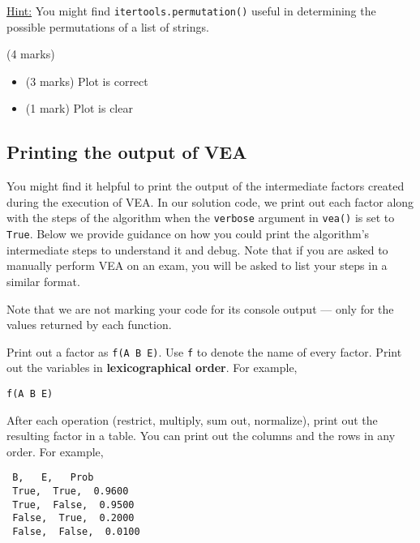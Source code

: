 \documentclass[12pt]{article}
\begin{document}
\begin{enumerate}[font=\Large,label=(\alph*)]
\underline{Hint:} You might find \verb+itertools.permutation()+ useful in determining the possible permutations of a list of strings.

\newpage
\begin{markscheme}
(4 marks)

\begin{itemize}
\item (3 marks) Plot is correct
\item (1 mark) Plot is clear
\end{itemize}
\end{markscheme}


\end{enumerate}

\begin{appendices}

\section{Printing the output of VEA}
\label{apx:vea_output_format}

You might find it helpful to print the output of the intermediate factors created during the execution of VEA. In our solution code, we print out each factor along with the steps of the algorithm when the \verb+verbose+ argument in \verb+vea()+ is set to \verb+True+. Below we provide guidance on how you could print the algorithm's intermediate steps to understand it and debug. Note that if you are asked to manually perform VEA on an exam, you will be asked to list your steps in a similar format.

Note that we are not marking your code for its console output --- only for the values returned by each function.

Print out a factor as \verb+f(A B E)+. Use \verb+f+ to denote the name of every factor. Print out the variables in {\bf lexicographical order}. For example,
%
\begin{verbatim}
f(A B E)
\end{verbatim}


After each operation (restrict, multiply, sum out, normalize), print out the resulting factor in a table. You can print out the columns and the rows in any order. For example,
%
\begin{verbatim}
 B,   E,   Prob
 True,  True,  0.9600
 True,  False,  0.9500
 False,  True,  0.2000
 False,  False,  0.0100
\end{verbatim}




\end{appendices}
\end{document}

